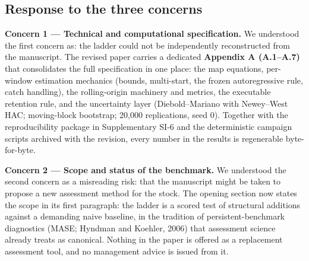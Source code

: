 \documentclass[11pt]{article}
\begin{document}
\subsection{Response to the three
concerns}\label{response-to-the-three-concerns}

\textbf{Concern 1 --- Technical and computational specification.} We
understood the first concern as: the ladder could not be independently
reconstructed from the manuscript. The revised paper carries a dedicated
\textbf{Appendix A (A.1--A.7)} that consolidates the full specification
in one place: the map equations, per-window estimation mechanics
(bounds, multi-start, the frozen autoregressive rule, catch handling),
the rolling-origin machinery and metrics, the executable retention rule,
and the uncertainty layer (Diebold--Mariano with Newey--West HAC;
moving-block bootstrap; 20,000 replications, seed 0). Together with the
reproducibility package in Supplementary SI-6 and the deterministic
campaign scripts archived with the revision, every number in the results
is regenerable byte-for-byte.

\textbf{Concern 2 --- Scope and status of the benchmark.} We understood
the second concern as a misreading risk: that the manuscript might be
taken to propose a new assessment method for the stock. The opening
section now states the scope in its first paragraph: the ladder is a
scored test of structural additions against a demanding naive baseline,
in the tradition of persistent-benchmark diagnostics (MASE; Hyndman and
Koehler, 2006) that assessment science already treats as canonical.
Nothing in the paper is offered as a replacement assessment tool, and no
management advice is issued from it.
\end{document}
